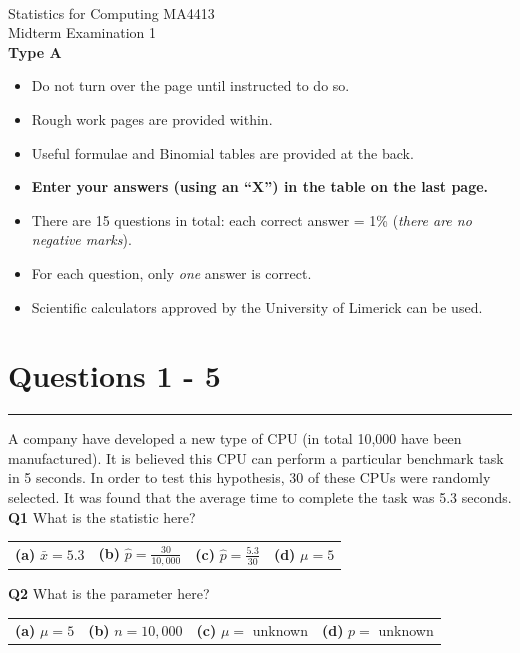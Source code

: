 \documentclass[12pt]{article}
\begin{document}
\quad\\[2cm]

\begin{center}
{\Huge Statistics for Computing MA4413\\[0.8cm]
Midterm Examination 1\\[1cm]
{\bf Type A}}\\[2cm]
\end{center}

\begin{itemize}\itemsep0.6cm
\item Do not turn over the page until instructed to do so.
\item Rough work pages are provided within.
\item Useful formulae and Binomial tables are provided at the back.
\item {\bf Enter your answers (using an ``X'') in the table on the last page.}
\item There are 15 questions in total: each correct answer = 1\% (\emph{there are no negative marks}).
\item For each question, only \emph{one} answer is correct.
\item Scientific calculators approved by the University of Limerick can be used.
\end{itemize}

\newpage
\section*{Questions 1 - 5}

\rule{\linewidth}{1pt}
\quad

A company have developed a new type of CPU (in total 10,000 have been manufactured). It is believed this CPU can perform a particular benchmark task in 5 seconds. In order to test this hypothesis, 30 of these CPUs were randomly selected. It was found that the average time to complete the task was 5.3 seconds.\\[0.3cm]

{\bf Q1} What is the statistic here?\\[0.2cm]
\begin{tabular}{cccc}
{\bf(a)} $\bar x = 5.3$ & {\bf(b)} $\hat p = \frac{30}{10,000}$ & {\bf(c)} $\hat p = \frac{5.3}{30}$ & {\bf(d)} $\mu = 5$ \\[0.6cm]
\end{tabular}

{\bf Q2} What is the parameter here?\\[0.2cm]
\begin{tabular}{cccc}
{\bf(a)} $\mu = 5$ & {\bf(b)} $n = 10,000$ & {\bf(c)} $\mu =$ unknown & {\bf(d)} $p =$ unknown \\[0.6cm]
\end{tabular}
\end{document}
